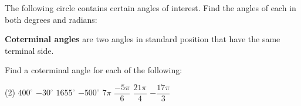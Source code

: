 \documentclass[../mathNotesPreamble]{subfiles}
\begin{document}
  \begin{ex*}
    The following circle contains certain angles of interest. Find the angles of each in both degrees and radians:
    \vspace*{2\baselineskip}

  \newcommand{\lCol}{gray!90}
    \begin{center}
    \end{center}
  \end{ex*}
  \pagebreak

  \begin{defn*}
    \textbf{Coterminal angles} are two angles in standard position that have the same terminal side.

  \end{defn*}
  \begin{ex*}
    Find a coterminal angle for each of the following:
    \begin{extasks}[after-item-skip=\stretch{1}](2)
      \task $400^\circ$
      \task $-30^\circ$
      \task $1655^\circ$
      \task $-500^\circ$
      \task $7\pi$
      \task $\dfrac{-5\pi}{6}$
      \task $\dfrac{21\pi}{4}$
      \task $-\dfrac{17\pi}{3}$
    \end{extasks}
  \end{ex*}

  \pagebreak
\end{document}
